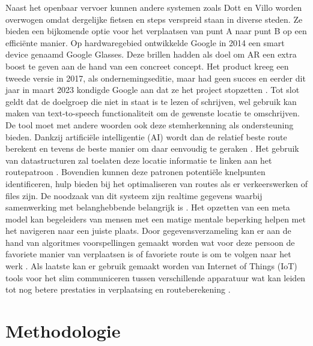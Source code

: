   Naast het openbaar vervoer kunnen andere systemen zoals Dott en Villo worden overwogen omdat dergelijke fietsen en steps verspreid staan in diverse steden.
  Ze bieden een bijkomende optie voor het verplaatsen van punt A naar punt B op een efficiënte manier.
  Op hardwaregebied ontwikkelde Google in 2014 een smart device genaamd Google Glasses.
  Deze brillen hadden als doel om AR een extra boost te geven aan de hand van een concreet concept.
  Het product kreeg een tweede versie in 2017, als ondernemingseditie, maar had geen succes en eerder dit jaar in maart 2023 kondigde Google aan dat ze het project stopzetten \autocite{Gvora2023}.
  Tot slot geldt dat de doelgroep die niet in staat is te lezen of schrijven, wel gebruik kan maken van text-to-speech functionaliteit om de gewenste locatie te omschrijven.
  De tool moet met andere woorden ook deze stemherkenning als ondersteuning bieden.
  Dankzij artificiële intelligentie (AI) wordt dan de relatief beste route berekent en tevens de beste manier om daar eenvoudig te geraken \autocite{Soni2023a}.
  Het gebruik van datastructuren zal toelaten deze locatie informatie te linken aan het routepatroon \autocite{Ruta2010}.
  Bovendien kunnen deze patronen potentiële knelpunten identificeren, hulp bieden bij het optimaliseren van routes als er verkeerswerken of files zijn.
  De noodzaak van dit systeem zijn realtime gegevens waarbij samenwerking met belanghebbende belangrijk is \autocite{Ciravegna2018}.
  Het opzetten van een meta model kan begeleiders van mensen met een matige mentale beperking helpen met het navigeren naar een juiste plaats.
  Door gegevensverzameling kan er aan de hand van algoritmes voorspellingen gemaakt worden wat voor deze persoon de favoriete manier van verplaatsen is of favoriete route is om te volgen naar het werk \autocite{Stepanov2003}.
  Als laatste kan er gebruik gemaakt worden van Internet of Things (IoT) tools voor het slim communiceren tussen verschillende apparatuur wat kan leiden tot nog betere prestaties in verplaatsing en routeberekening \autocite{Fatnassi2015}.


\section{Methodologie}%
\label{sec:methodologie}

